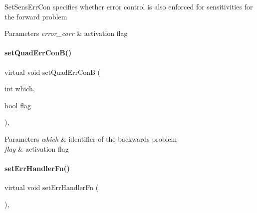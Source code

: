 Set\+Sens\+Err\+Con specifies whether error control is also enforced for sensitivities for the forward problem


\begin{DoxyParams}{Parameters}
{\em error\+\_\+corr} & activation flag \\
\hline
\end{DoxyParams}
\mbox{\label{classamici_1_1_solver_a0d5e55201b30383f1272146935f43c78}} 
\paragraph{\texorpdfstring{setQuadErrConB()}{setQuadErrConB()}}
{\footnotesize\ttfamily virtual void set\+Quad\+Err\+ConB (\begin{DoxyParamCaption}\item[{int}]{which,  }\item[{bool}]{flag }\end{DoxyParamCaption})\hspace{0.3cm}{\ttfamily [protected]}, {}}


\begin{DoxyParams}{Parameters}
{\em which} & identifier of the backwards problem \\
\hline
{\em flag} & activation flag \\
\hline
\end{DoxyParams}
\mbox{\label{classamici_1_1_solver_ab5e90e0ad8f195cd6ca2ce477cc734b7}} 
\paragraph{\texorpdfstring{setErrHandlerFn()}{setErrHandlerFn()}}
{\footnotesize\ttfamily virtual void set\+Err\+Handler\+Fn (\begin{DoxyParamCaption}{ }\end{DoxyParamCaption})\hspace{0.3cm}{\ttfamily [protected]}, {}}

\mbox{\label{classamici_1_1_solver_ac1ca4675503688acf946f6530fb12c10}} 
